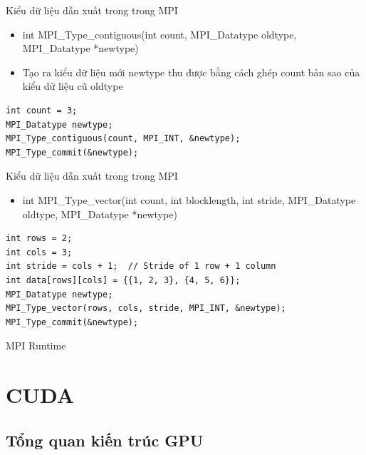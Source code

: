 \documentclass[10pt]{beamer}
\theoremstyle{remark}
\numberwithin{algocf}{section}
\numberwithin{equation}{section}
\numberwithin{dl}{section}
\numberwithin{figure}{section}
\begin{document}
\begin{frame}[fragile]{Kiểu dữ liệu dẫn xuất trong trong MPI}
    \begin{itemize}
        \item int MPI\_Type\_contiguous(int count, MPI\_Datatype oldtype,
                                        MPI\_Datatype *newtype)
        \item Tạo ra kiểu dữ liệu mới newtype thu được bằng cách ghép count bản sao của kiểu dữ liệu cũ oldtype
       
    \end{itemize}
    \begin{verbatim}
int count = 3;
MPI_Datatype newtype;
MPI_Type_contiguous(count, MPI_INT, &newtype);
MPI_Type_commit(&newtype);
    \end{verbatim}
\end{frame}

\begin{frame}[fragile]{Kiểu dữ liệu dẫn xuất trong trong MPI}
    \begin{itemize}
        \item int MPI\_Type\_vector(int count, int blocklength, int stride,
                                    MPI\_Datatype oldtype,
                                    MPI\_Datatype *newtype)
    \end{itemize}

    \begin{verbatim}
int rows = 2;
int cols = 3;
int stride = cols + 1;  // Stride of 1 row + 1 column
int data[rows][cols] = {{1, 2, 3}, {4, 5, 6}};
MPI_Datatype newtype;
MPI_Type_vector(rows, cols, stride, MPI_INT, &newtype);
MPI_Type_commit(&newtype);
    \end{verbatim}
\end{frame}

\begin{frame}{MPI Runtime}
    
\end{frame}

\section{CUDA}

\subsection{Tổng quan kiến trúc GPU}
\end{document}
